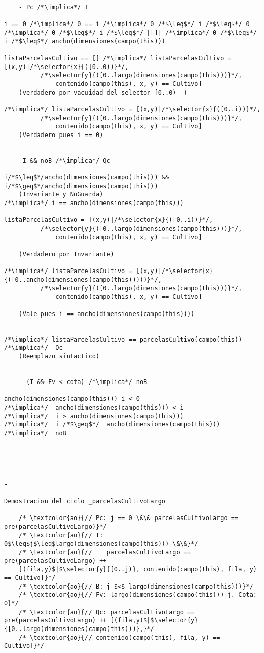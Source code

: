 \begin{lstlisting}
    - Pc /*\implica*/ I
    
i == 0 /*\implica*/ 0 == i /*\implica*/ 0 /*$\leq$*/ i /*$\leq$*/ 0
/*\implica*/ 0 /*$\leq$*/ i /*$\leq$*/ |[]| /*\implica*/ 0 /*$\leq$*/ i /*$\leq$*/ ancho(dimensiones(campo(this)))

listaParcelasCultivo == [] /*\implica*/ listaParcelasCultivo = [(x,y)|/*\selector{x}{([0..0))}*/,	
  		  /*\selector{y}{([0..largo(dimensiones(campo(this)))}*/,
    		  contenido(campo(this), x, y) == Cultivo]
    (verdadero por vacuidad del selector [0..0)  )
    
/*\implica*/ listaParcelasCultivo = [(x,y)|/*\selector{x}{([0..i))}*/,	
  		  /*\selector{y}{([0..largo(dimensiones(campo(this)))}*/,
    		  contenido(campo(this), x, y) == Cultivo]
    (Verdadero pues i == 0)
    

   - I && noB /*\implica*/ Qc
   
i/*$\leq$*/ancho(dimensiones(campo(this))) &&  i/*$\geq$*/ancho(dimensiones(campo(this)))
	(Invariante y NoGuarda)
/*\implica*/ i == ancho(dimensiones(campo(this)))

listaParcelasCultivo = [(x,y)|/*\selector{x}{([0..i))}*/,	
  		  /*\selector{y}{([0..largo(dimensiones(campo(this)))}*/,
    		  contenido(campo(this), x, y) == Cultivo]
    
    (Verdadero por Invariante)
    
/*\implica*/ listaParcelasCultivo = [(x,y)|/*\selector{x}{([0..ancho(dimensiones(campo(this)))))}*/,	
  		  /*\selector{y}{([0..largo(dimensiones(campo(this)))}*/,
    		  contenido(campo(this), x, y) == Cultivo]
	
	(Vale pues i == ancho(dimensiones(campo(this))))    


/*\implica*/ listaParcelasCultivo == parcelasCultivo(campo(this))  /*\implica*/  Qc
	(Reemplazo sintactico)
	
	
    - (I && Fv < cota) /*\implica*/ noB
    
ancho(dimensiones(campo(this)))-i < 0
/*\implica*/  ancho(dimensiones(campo(this))) < i
/*\implica*/  i > ancho(dimensiones(campo(this)))
/*\implica*/  i /*$\geq$*/  ancho(dimensiones(campo(this))) /*\implica*/  noB

	
-----------------------------------------------------------------------
-----------------------------------------------------------------------

Demostracion del ciclo _parcelasCultivoLargo

    /* \textcolor{ao}{// Pc: j == 0 \&\& parcelasCultivoLargo == pre(parcelasCultivoLargo)}*/      
    /* \textcolor{ao}{// I: 0$\leq$j$\leq$largo(dimensiones(campo(this))) \&\&}*/        
    /* \textcolor{ao}{//    parcelasCultivoLargo == pre(parcelasCultivoLargo) ++ 
    [(fila,y)$|$\selector{y}{[0..j)}, contenido(campo(this), fila, y) == Cultivo]}*/ 
    /* \textcolor{ao}{// B: j $<$ largo(dimensiones(campo(this)))}*/
	/* \textcolor{ao}{// Fv: largo(dimensiones(campo(this)))-j. Cota: 0}*/     
    /* \textcolor{ao}{// Qc: parcelasCultivoLargo == pre(parcelasCultivoLargo) ++ [(fila,y)$|$\selector{y}{[0..largo(dimensiones(campo(this)))},}*/
    /* \textcolor{ao}{// contenido(campo(this), fila, y) == Cultivo]}*/      



\end{lstlisting}
